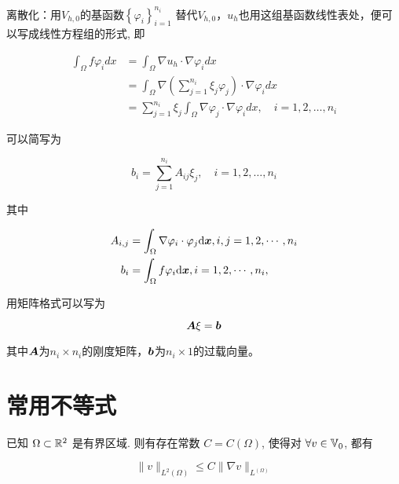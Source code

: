 \documentclass{article}
\begin{document}
离散化：用$V_{h,0}$的基函数$\left\{\varphi_{i}\right\}_{i=1}^{n_{i}}$ 替代$V_{h,0}$，$u_h$也用这组基函数线性表处，便可以写成线性方程组的形式, 即

\begin{equation}
\begin{aligned}
\int_{\Omega} f \varphi_{i} d x &=\int_{\Omega} \nabla u_{h} \cdot \nabla \varphi_{i} d x \\
&=\int_{\Omega} \nabla\left(\sum_{j=1}^{n_{i}} \xi_{j} \varphi_{j}\right) \cdot \nabla \varphi_{i} d x \\
&=\sum_{j=1}^{n_{i}} \xi_{j} \int_{\Omega} \nabla \varphi_{j} \cdot \nabla \varphi_{i} d x, \quad i=1,2, \ldots, n_{i}
\end{aligned}
\end{equation}

可以简写为

\begin{equation}
b_{i}=\sum_{j=1}^{n_{i}} A_{i j} \xi_{j}, \quad i=1,2, \ldots, n_{i}
\end{equation}

其中

\begin{equation}
    \begin{aligned}
        A_{i, j} & = \int_{\Omega} \nabla \varphi_i \cdot \varphi_j {\mathrm d} {\boldsymbol x},
        i, j = 1, 2, \cdots, n_i \\
        b_i & = \int_{\Omega} f \varphi_i {\mathrm d} {\boldsymbol x}, i = 1,2, \cdots, n_i, \\
    \end{aligned}
\end{equation}

用矩阵格式可以写为

\begin{equation}
{\boldsymbol A} \xi = {\boldsymbol b}
\end{equation}

其中${\boldsymbol A}$为$n_i \times n_i$的刚度矩阵，${\boldsymbol b}$为$n_i \times 1$的过载向量。 

\section{常用不等式}

\begin{theorem}

    已知 $\Omega \subset {\mathbb R}^2$ 是有界区域. 
    则有存在常数 $C = C(\Omega)$, 使得对 $\forall v \in {\mathbb V}_0$, 都有

    \begin{equation}
        \|v\|_{L^2(\Omega)} \le C \|\nabla v\|_{L^(\Omega)}
    \end{equation}
    
\end{theorem}
\end{document}
